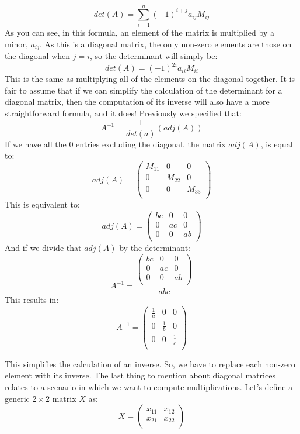 \documentclass[600paper, 11pt,twoside,openany]{kdp}
\begin{document}
\[det(A) = \sum_{i=1}^n(-1)^{i+j}a_{ij}M_{ij}\]
\indent As you can see, in this formula, an element of the matrix is multiplied by a minor, $a_{ij}$. As this is a diagonal matrix, the only non-zero elements are those on the diagonal when $j=i$, so the determinant will simply be:
\[det(A) =(-1)^{2i}a_{ii}M_{ii}\]
\indent This is the same as multiplying all of the elements on the diagonal together. It is fair to assume that if we can simplify the calculation of the determinant for a diagonal matrix, then the computation of its inverse will also have a more straightforward formula, and it does! Previously we specified that:
\[A^{-1} = \frac{1}{det(a)}(adj(A))\]
\indent If we have all the 0 entries excluding  the diagonal, the matrix $adj(A)$, is equal to:
 \[adj(A) = \begin{pmatrix}
M_{11} & 0 & 0 \\
0 & M_{22} & 0 \\
0 & 0 & M_{33} \\
\end{pmatrix} \]
\indent This is equivalent to:
\[adj(A) = \begin{pmatrix}
bc & 0 & 0 \\
0 & ac & 0 \\
0 & 0 & ab \\
\end{pmatrix} \]
\indent And if we divide that $adj(A)$ by the determinant:
\[A^{-1} = \frac{\begin{pmatrix}
bc & 0 & 0 \\
0 & ac & 0 \\
0 & 0 & ab \\
\end{pmatrix}}{abc} \]
\indent This results in:
\[A^{-1} = \begin{pmatrix}
\frac{1}{a} & 0 & 0 \\
0 & \frac{1}{b} & 0 \\
0 & 0 & \frac{1}{c} \\
\end{pmatrix} \]
\par 
\vspace{-3pt}
\indent This simplifies the calculation of an inverse. So, we have to replace each non-zero element with its inverse. The last thing to mention about diagonal matrices relates to a scenario in which we want to compute multiplications. Let’s define a generic $2 \times 2$ matrix $X$ as:
\[X = \begin{pmatrix}
x_{11} & x_{12}  \\
x_{21} & x_{22}  \\
\end{pmatrix}
\]
\end{document}
